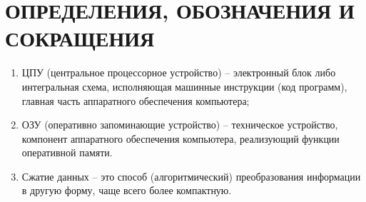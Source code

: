 \section*{ОПРЕДЕЛЕНИЯ, ОБОЗНАЧЕНИЯ И СОКРАЩЕНИЯ}

\begin{enumerate}
	\item ЦПУ (центральное процессорное устройство)  -- электронный блок либо интегральная схема, исполняющая машинные инструкции (код программ), главная часть аппаратного обеспечения компьютера;

	\item ОЗУ (оперативно запоминающие устройство) -- техническое устройство, компонент аппаратного обеспечения компьютера, реализующий функции оперативной памяти.
	
	\item Сжатие данных --  это способ (алгоритмический) преобразования информации в другую форму, чаще всего более компактную.
\end{enumerate}

\pagebreak